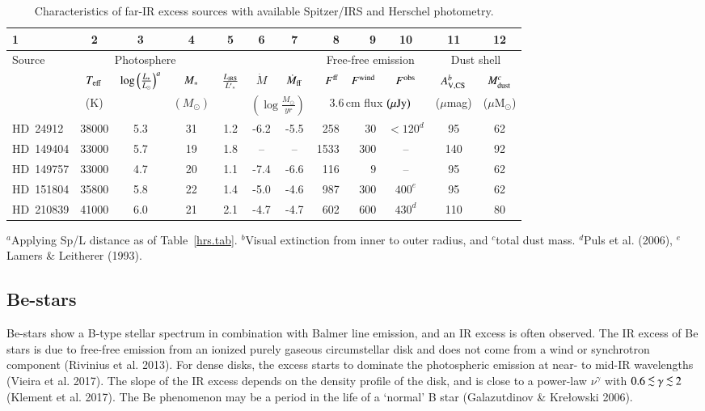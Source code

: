 \documentclass[tradiabstract]{aa} %
\newcommand{\Msun} {M$_{\odot}$}
\newcommand{\simless}{\mathbin{\lower 3pt\hbox {$\rlap{\raise
        5pt\hbox{$\char'074$}}\mathchar"7218$}}}
\begin{document}
\begin{table*} [h!tb]
\begin{center}
  \caption{Characteristics of far-IR excess sources with available
    Spitzer/IRS and Herschel photometry. \label{model.tab}}
  \begin{tabular}{l ccc ccc rrc cc}
    \hline
    \hline
  1& 2&  3& 4& 5& 6& 7& 8& 9& 10 & 11 & 12\\
  \hline
  Source   &  \multicolumn{3}{c}{Photosphere}  &  & & & \multicolumn{3}{c}{Free-free emission}
  & \multicolumn{2}{c}{Dust shell} \\ 
  \hline
  & $T_{\rm{eff}}$ & $\log{\left(\frac{L_{\rm {*}}}{L_{\odot}}\right)}^a$  & $M_{\rm {*}}$ & 
  $\frac{L_{\rm {IRS}}}{L{'}_{*}}$  &
  $\dot{M}$ &  $\dot{M}_{\rm {ff}}$ & $F^{\rm {ff}}$ & $F^{\rm {wind}}$ & $F^{\rm {obs}}$ & $A_{\rm{V, CS}}^b$ & $M_{\rm {dust}}^c$ \\
  &(K) & &  $\left(M_{\odot}\right)$ & & \multicolumn{2}{c}{$\left(\log\frac{M_{\odot}}{yr}\right)$} &
  \multicolumn{3}{c}{3.6\,cm flux $\left(\mu\rm{Jy}\right)$ }  & ($\mu$mag) &($\mu$\Msun )\\
  \hline
HD~24912        &38000 &5.3& 31 & 1.2&  -6.2 &-5.5 &258& $30 $ & $<120^d$&  95  & 62 \\
HD~149404       &33000 &5.7& 19 & 1.8&  -- & -- &1533&$ 300$ & –       &  140 & 92 \\
HD~149757       &33000 &4.7& 20 & 1.1&  -7.4 &-6.6 &116 &$ 9$   & –       &  95  & 62 \\
HD~151804       &35800 &5.8& 22 & 1.4&  -5.0 &-4.6 &987 &$ 300$ &$ 400^e$ &  95  & 62 \\
HD~210839       &41000 &6.0& 21 & 2.1&  -4.7 &-4.7 &602 & $600$ & $430^d$ &  110 & 80\\
\hline
\end{tabular}
\end{center}
$^a$Applying Sp/L distance as of Table~\ref{hrs.tab}. $^b$Visual
extinction from inner to outer radius, and $^c$total dust mass. $^d$Puls
et al. (2006), $^e$Lamers \& Leitherer (1993).



\end{table*}

\subsection{Be-stars}

Be-stars show a B-type stellar spectrum in combination with Balmer
line emission, and an IR excess is often observed. The IR excess of Be
stars is due to free-free emission from an ionized purely gaseous
circumstellar disk and does not come from a wind or synchrotron
component (Rivinius et al. 2013). For dense disks, the excess starts to
dominate the photospheric emission at near- to mid-IR wavelengths
(Vieira et al. 2017). The slope of the IR excess depends on the
density profile of the disk, and is close to a power-law
$\nu^{\gamma}$ with $0.6 \simless \gamma \simless 2$ (Klement et
al. 2017). The Be phenomenon may be a period in the life of{ a}
`normal' B star (Galazutdinov \& Kre{\l}owski 2006).
\end{document}
